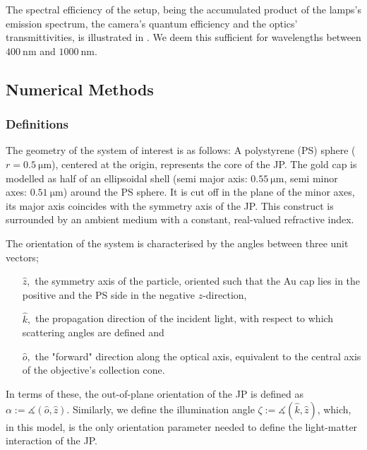 \documentclass[10pt]{article}
\newcommand{\reffig}[2]{\mbox{\sffamily{Figure \ref{#1}#2}}}
\begin{document}
The spectral efficiency of the setup, being the accumulated product of the lamps's emission spectrum, the camera's quantum efficiency and the optics' transmittivities, is illustrated in \reffig{fig:corrections}{}. 
We deem this sufficient for wavelengths between $\SI{400}{\nano\meter}$ and $\SI{1000}{\nano\meter}$. 






\subsection*{Numerical Methods}

\subsubsection*{Definitions}



The geometry of the system of interest is as follows: 
A polystyrene (PS) sphere ($r=\SI{0.5}{\micro\meter}$), centered at the origin, represents the core of the JP. 
The gold cap is modelled as half of an ellipsoidal shell (semi major axis: $\SI{0.55}{\micro\meter}$, semi minor axes: $\SI{0.51}{\micro\meter}$) around the PS sphere. 
It is cut off in the plane of the minor axes, its major axis coincides with the symmetry axis of the JP. 
This construct is surrounded by an ambient medium with a constant, real-valued refractive index.  

The orientation of the system is characterised by the angles between three unit vectors;
\begin{itemize}
    \item[$\hat{z},$] the symmetry axis of the particle, oriented such that the Au cap lies in the positive and the PS side in the negative $z$-direction, 
    \item[$\hat{k},$] the propagation direction of the incident light, with respect to which scattering angles are defined and
    \item[$\hat{o},$] the "forward" direction along the optical axis, equivalent to the central axis of the objective's collection cone. 
\end{itemize}
In terms of these, the out-of-plane orientation of the JP is defined as
$\alpha := \measuredangle( \hat{o}, \hat{z} )$.
Similarly, we define the illumination angle 
$\zeta := \measuredangle( \hat{k}, \hat{z} )$, 
which, in this model, is the only orientation parameter needed to define the light-matter interaction of the JP. 
\end{document}
